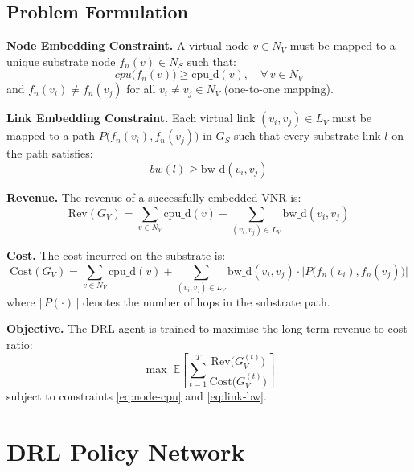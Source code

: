 \documentclass[12pt,a4paper]{report}
\begin{document}
\subsection{Problem Formulation}

\textbf{Node Embedding Constraint.} A virtual node $v\in N_V$ must be mapped to a unique
substrate node $f_n(v)\in N_S$ such that:
\begin{equation}
  cpu\bigl(f_n(v)\bigr) \geq \text{cpu\_d}(v), \quad \forall\,v\in N_V
  \label{eq:node-cpu}
\end{equation}
and $f_n(v_i)\neq f_n(v_j)$ for all $v_i\neq v_j\in N_V$ (one-to-one mapping).

\textbf{Link Embedding Constraint.} Each virtual link $(v_i,v_j)\in L_V$ must be mapped to a
path $P\bigl(f_n(v_i),f_n(v_j)\bigr)$ in $G_S$ such that every substrate link $l$ on the
path satisfies:
\begin{equation}
  bw(l) \geq \text{bw\_d}(v_i,v_j)
  \label{eq:link-bw}
\end{equation}

\textbf{Revenue.} The revenue of a successfully embedded VNR is:
\begin{equation}
  \text{Rev}(G_V) = \sum_{v\in N_V}\text{cpu\_d}(v)
                  + \sum_{(v_i,v_j)\in L_V}\text{bw\_d}(v_i,v_j)
  \label{eq:revenue}
\end{equation}

\textbf{Cost.} The cost incurred on the substrate is:
\begin{equation}
  \text{Cost}(G_V) = \sum_{v\in N_V}\text{cpu\_d}(v)
                   + \sum_{(v_i,v_j)\in L_V}\text{bw\_d}(v_i,v_j)
                     \cdot \bigl|P\bigl(f_n(v_i),f_n(v_j)\bigr)\bigr|
  \label{eq:cost}
\end{equation}
where $|\,P(\cdot)\,|$ denotes the number of hops in the substrate path.

\textbf{Objective.} The DRL agent is trained to maximise the long-term revenue-to-cost ratio:
\begin{equation}
  \max\;\mathbb{E}\!\left[\sum_{t=1}^{T}
      \frac{\text{Rev}\bigl(G_V^{(t)}\bigr)}{\text{Cost}\bigl(G_V^{(t)}\bigr)}\right]
  \label{eq:objective}
\end{equation}
subject to constraints \eqref{eq:node-cpu} and \eqref{eq:link-bw}.

\section{DRL Policy Network}
\end{document}
